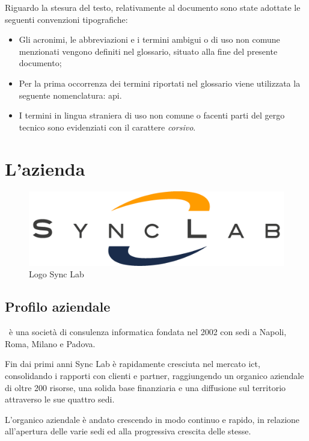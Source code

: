 Riguardo la stesura del testo, relativamente al documento sono state adottate le seguenti convenzioni tipografiche:
\begin{itemize}
	\item Gli acronimi, le abbreviazioni e i termini ambigui o di uso non comune menzionati vengono definiti nel glossario, situato alla fine del presente documento;
	\item Per la prima occorrenza dei termini riportati nel glossario viene utilizzata la seguente nomenclatura: \gls{api}\gloss.
	\item I termini in lingua straniera di uso non comune o facenti parti del gergo tecnico sono evidenziati con il carattere \emph{corsivo}.
\end{itemize}


\section{L'azienda}

\begin{figure}[H]
	\centering
	\includegraphics[width=\textwidth/2]{immagini/logo-synclab.png}
	\caption{Logo Sync Lab}
\end{figure}

\subsection{Profilo aziendale}
\myCompany\ è una società di consulenza informatica fondata nel 2002 con sedi a Napoli, Roma, Milano e Padova.

Fin dai primi anni Sync Lab è rapidamente cresciuta nel mercato \gls{ict}, consolidando i rapporti con clienti e partner, raggiungendo un organico aziendale di oltre 200 risorse,
una solida base finanziaria e una diffusione sul territorio attraverso le sue quattro sedi.

L'organico aziendale è andato crescendo in modo continuo e rapido, in relazione
all'apertura delle varie sedi ed alla progressiva crescita delle stesse.

